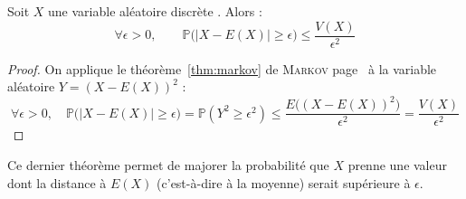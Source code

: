 \documentclass[11pt,a4paper,fleqn,pdftex]{report}
\begin{document}
\begin{itheorem}
     Soit $X$ une variable aléatoire discrète . Alors : 
     \begin{equation}
     \forall \epsilon > 0,\qquad \mathbb{P}\Big( \big| X - E(X) \big| \ge \epsilon \Big) \le \dfrac{V(X)}{\epsilon^2}
     \end{equation}
\end{itheorem}
\begin{proof}
     On applique le théorème~\ref{thm:markov} de \textsc{Markov} page~\pageref{thm:markov} à la variable aléatoire $Y= (X - E(X))^2$ : 
     \begin{equation*}
          \forall \epsilon> 0, \quad \mathbb{P}\Big( \big| X - E(X) \big| \ge \epsilon \Big)=\mathbb{P}(Y^2 \ge \epsilon^2)\le \dfrac{E\big( (X-E(X))^2\big)}{\epsilon^2} = \dfrac{V(X)}{\epsilon^2}
     \end{equation*}
\end{proof}
Ce dernier théorème permet de majorer la probabilité que $X$ prenne une valeur dont la distance à $E(X)$ (c'est-à-dire à la moyenne) serait supérieure à $\epsilon$.
\end{document}
